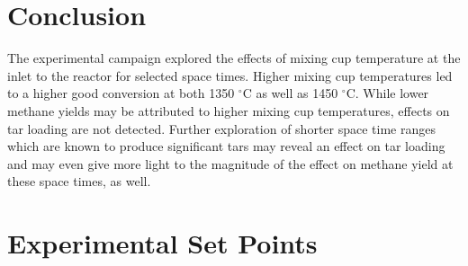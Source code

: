 \documentclass[11pt,twocolumn]{article}
\begin{document}
\section*{Conclusion}

The experimental campaign explored the effects
of mixing cup temperature at the inlet to the reactor for selected space times. Higher mixing cup
temperatures led to a higher good conversion at
both 1350 $^\circ$C as well as 1450 $^\circ$C. While lower
methane yields may be attributed to higher mixing cup temperatures, effects on tar loading are
not detected. Further exploration of shorter space
time ranges which are known to produce significant tars may reveal an effect on tar loading and
may even give more light to the magnitude of the
effect on methane yield at these space times, as
well.
\balance

\onecolumn
\appendix
\section{Experimental Set Points}
\label{app_sp}
\end{document}
